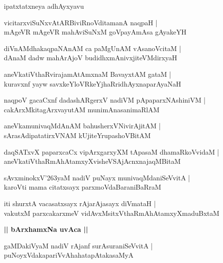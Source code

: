 \documentclass[twoside,12pt,openright]{book}
\def\S{\char'263}
\newcounter{shloka}[chapter]
\def\uvaca#1{\centerline{{\large\textbf{#1}}}}
\begin{document}
\begin{center}
ipatxtatxneya adhAyxyavu
\end{center}

\begin{shloka}%
vicitarxviSuNxvAtARBiviRnoVditamanA naqpaH |\\
mAgeVR mAgeVR mahAviSuNxM goVpayAmAsa gAyakeYH 
\end{shloka}

\begin{shloka}%
diVnAMdhakaqpaNAnAM ca paMgUnAM vAsanoVcitaM |\\
dAnaM dadw mahArAjoV budidhxmAnivxjiteVMdirxyaH 
\end{shloka}

\begin{shloka}%
aneVkatiVthaRvirajamAtAmxnaM BavayxtAM gataM |\\
kuravxnf yayw savxkeYloVRkeYjhaRridhAyxnaparAyaNaH 
\end{shloka}

\begin{shloka}%
naqpoV gacaCxnf dadashARgerxV nadiVM pApaparxNAshiniVM |\\
cakArxMkitagArxvayutAM munimAnasanimaRlAM 
\end{shloka}

\begin{shloka}%
aneVkamunivaqMdAnAM bahusherxVNivirAjitAM |\\
sArasAdipatatirxVNAM kUjiteYrupashoVBitAM 
\end{shloka}

\begin{shloka}%
daqSATxvX paparxcaCx vipArxgarxyXM tApasaM dhamaRkoVvidaM |\\
aneVkatiVthaRmAhAtamxyXvisheVSAjAcnxnajaqMBitaM 
\end{shloka}

\begin{shloka}%
sAvxminokxV\S yaM nadiV puNayx munivaqMdaniSeVvitA |\\
karoVti mama citatxsayx parxmoVdaBaraniBaRraM 
\end{shloka}

\begin{shloka}%
iti shurxtA vacasatxsayx rAjarAjasayx diVmataH |\\
vakutxM parxcakarxmeV vidAvxMsitxVthaRmAhAtamxyXmaduBxtaM 
\end{shloka}

\uvaca{|| bArxhamxNa uvAca ||}

\begin{shloka}%
gaMDakiVyaM nadiV rAjanf surAsuraniSeVvitA |\\
puNoyxVdakapariVvAhahatapAtakasaMyA
\end{shloka}
\end{document}
